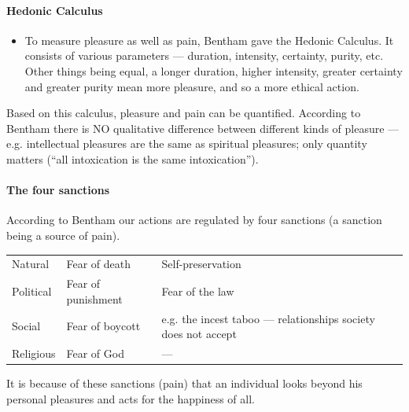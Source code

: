 \paragraph{Hedonic Calculus}
\begin{itemize}
\item To measure pleasure as well as pain, Bentham gave the Hedonic Calculus. It consists of various parameters --- duration, intensity, certainty, purity, etc. Other things being equal, a longer duration, higher intensity, greater certainty and greater purity mean more pleasure, and so a more ethical action.
\end{itemize}

\begin{CriticalPoint}
Based on this calculus, pleasure and pain can be quantified. According to Bentham there is NO qualitative difference between different kinds of pleasure --- e.g. intellectual pleasures are the same as spiritual pleasures; only quantity matters (``all intoxication is the same intoxication'').
\end{CriticalPoint}

\paragraph{The four sanctions} According to Bentham our actions are regulated by four sanctions (a sanction being a source of pain).

\begin{center}
\begin{tabularx}{\textwidth}{>{\raggedright\arraybackslash}p{2.6cm} >{\raggedright\arraybackslash}p{3.4cm} Y}
 &  &  \\
\toprule
Natural & Fear of death & Self-preservation \\
Political & Fear of punishment & Fear of the law \\
Social & Fear of boycott & e.g. the incest taboo --- relationships society does not accept \\
Religious & Fear of God & --- \\
\bottomrule
\end{tabularx}
\end{center}

\begin{KeyConcept}
It is because of these sanctions (pain) that an individual looks beyond his personal pleasures and acts for the happiness of all.
\end{KeyConcept}

